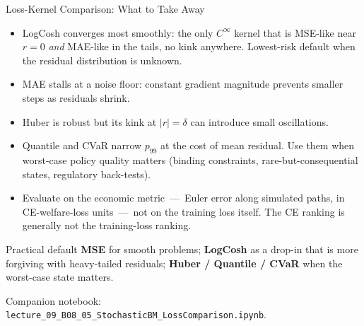 \documentclass[aspectratio=169,11pt]{beamer}
\newcommand{\emphc}[1]{\textcolor{harvardcrimson}{#1}}
\begin{document}
\begin{frame}{Loss-Kernel Comparison: What to Take Away}
\scriptsize
\begin{itemize}\itemsep1.5pt
    \item \emphc{LogCosh converges most smoothly:} the only $C^\infty$ kernel that is MSE-like near $r=0$ \emph{and} MAE-like in the tails, no kink anywhere.  Lowest-risk default when the residual distribution is unknown.
    \item \emphc{MAE stalls} at a noise floor: constant gradient magnitude prevents smaller steps as residuals shrink.
    \item \emphc{Huber is robust} but its kink at $|r|{=}\delta$ can introduce small oscillations.
    \item \emphc{Quantile and CVaR} narrow $p_{99}$ at the cost of mean residual.  Use them when worst-case policy quality matters (binding constraints, rare-but-consequential states, regulatory back-tests).
    \item \emphc{Evaluate on the economic metric}~---~Euler error along simulated paths, in CE-welfare-loss units~---~not on the training loss itself.  The CE ranking is generally not the training-loss ranking.
\end{itemize}

\vspace{0.4em}
\begin{exampleblock}{Practical default}
\textbf{MSE} for smooth problems; \textbf{LogCosh} as a drop-in that is more forgiving with heavy-tailed residuals; \textbf{Huber / Quantile / CVaR} when the worst-case state matters.
\end{exampleblock}

\vspace{0.2em}
{\scriptsize Companion notebook: \texttt{lecture\_09\_B08\_05\_StochasticBM\_LossComparison.ipynb}.}
\end{frame}
\end{document}
